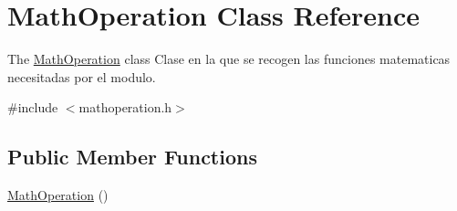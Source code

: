 \hypertarget{class_math_operation}{\section{Math\+Operation Class Reference}
\label{class_math_operation}
}


The \hyperlink{class_math_operation}{Math\+Operation} class Clase en la que se recogen las funciones matematicas necesitadas por el modulo.  




{\ttfamily \#include $<$mathoperation.\+h$>$}

\subsection*{Public Member Functions}
\begin{DoxyCompactItemize}
\item 
\hypertarget{class_math_operation_a06454b3f5ca3dda040cf1e84d57d728c}{\hyperlink{class_math_operation_a06454b3f5ca3dda040cf1e84d57d728c}{Math\+Operation} ()}\label{class_math_operation_a06454b3f5ca3dda040cf1e84d57d728c}


\end{DoxyCompactItemize}
